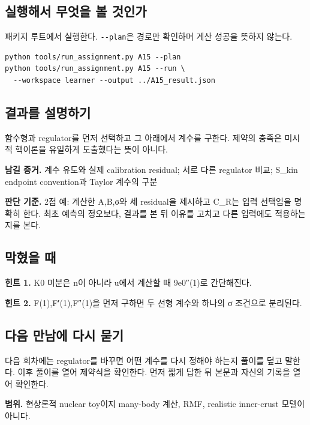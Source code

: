 \documentclass[
  10pt,
  a4paper,
]{article}
\begin{document}
\newpage

\subsection{실행해서 무엇을 볼
것인가}\label{uxc2e4uxd589uxd574uxc11c-uxbb34uxc5c7uxc744-uxbcfc-uxac83uxc778uxac00}

패키지 루트에서 실행한다. \texttt{-\/-plan}은 경로만 확인하며 계산
성공을 뜻하지 않는다.

\begin{verbatim}
python tools/run_assignment.py A15 --plan
python tools/run_assignment.py A15 --run \
  --workspace learner --output ../A15_result.json
\end{verbatim}

\subsection{결과를
설명하기}\label{uxacb0uxacfcuxb97c-uxc124uxba85uxd558uxae30}

함수형과 regulator를 먼저 선택하고 그 아래에서 계수를 구한다. 제약의
충족은 미시적 핵이론을 유일하게 도출했다는 뜻이 아니다.

\textbf{남길 증거.} 계수 유도와 실제 calibration residual; 서로 다른
regulator 비교; S\_kin endpoint convention과 Taylor 계수의 구분

\textbf{판단 기준.} 2점 예: 계산한 A,B,σ와 세 residual을 제시하고 C\_R는
입력 선택임을 명확히 한다. 최초 예측의 정오보다, 결과를 본 뒤 이유를
고치고 다른 입력에도 적용하는지를 본다.

\subsection{막혔을 때}\label{uxb9c9uxd614uxc744-uxb54c}

\textbf{힌트 1.} K0 미분은 n이 아니라 u에서 계산할 때 9e0″(1)로
간단해진다.

\textbf{힌트 2.} F(1),F′(1),F″(1)을 먼저 구하면 두 선형 계수와 하나의 σ
조건으로 분리된다.

\subsection{다음 만남에 다시
묻기}\label{uxb2e4uxc74c-uxb9ccuxb0a8uxc5d0-uxb2e4uxc2dc-uxbb3buxae30}

다음 회차에는 regulator를 바꾸면 어떤 계수를 다시 정해야 하는지 풀이를
덮고 말한다. 이후 풀이를 열어 제약식을 확인한다. 먼저 짧게 답한 뒤
본문과 자신의 기록을 열어 확인한다.

\textbf{범위.} 현상론적 nuclear toy이지 many-body 계산, RMF, realistic
inner-crust 모델이 아니다.
\end{document}
